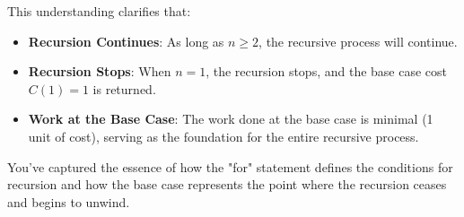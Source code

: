 \documentclass{article}
\begin{document}
This understanding clarifies that:
\begin{itemize}
    \item \textbf{Recursion Continues}: As long as \( n \geq 2 \), the recursive process will continue.
    \item \textbf{Recursion Stops}: When \( n = 1 \), the recursion stops, and the base case cost \( C(1) = 1 \) is returned.
    \item \textbf{Work at the Base Case}: The work done at the base case is minimal (1 unit of cost), serving as the foundation for the entire recursive process.
\end{itemize}

You've captured the essence of how the "for" statement defines the conditions for recursion and how the base case represents the point where the recursion ceases and begins to unwind.
\end{document}
